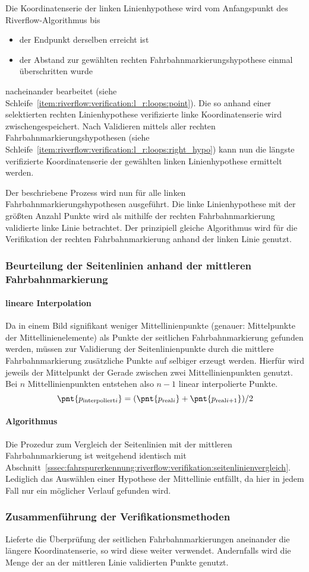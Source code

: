 Die Koordinatenserie der linken Linienhypothese wird vom Anfangspunkt des Riverflow-Algorithmus bis
\begin{itemize}
\item der Endpunkt derselben erreicht ist 
\item der Abstand zur gewählten rechten Fahrbahnmarkierungshypothese einmal überschritten wurde
\end{itemize}
nacheinander bearbeitet (siehe Schleife~\ref{item:riverflow:verification:l_r:loops:point}). Die so anhand einer selektierten rechten Linienhypothese verifizierte linke Koordinatenserie wird zwischengespeichert. 
Nach Validieren mittels aller rechten Fahrbahnmarkierungshypothesen (siehe Schleife~\ref{item:riverflow:verification:l_r:loops:right_hypo}) kann nun die längste verifizierte Koordinatenserie der gewählten linken Linienhypothese ermittelt werden.

Der beschriebene Prozess wird nun für alle linken Fahrbahnmarkierungshypothesen ausgeführt. Die linke Linienhypothese mit der größten Anzahl Punkte wird als mithilfe der rechten Fahrbahnmarkierung validierte linke Linie betrachtet. Der prinzipiell gleiche Algorithmus wird für die Verifikation der rechten Fahrbahnmarkierung anhand der linken Linie genutzt.

\subsubsection{Beurteilung der Seitenlinien anhand der mittleren Fahrbahnmarkierung}
\paragraph{lineare Interpolation}
Da in einem Bild signifikant weniger Mittellinienpunkte (genauer: Mittelpunkte der Mittellinienelemente) als Punkte der seitlichen Fahrbahnmarkierung gefunden werden, müssen zur Validierung der Seitenlinienpunkte durch die mittlere Fahrbahnmarkierung zusätzliche Punkte auf selbiger erzeugt werden. Hierfür wird jeweils der Mittelpunkt der Gerade zwischen zwei Mittellinienpunkten genutzt. Bei \( n \) Mittellinienpunkten entstehen also \( n-1 \) linear interpolierte Punkte.
\begin{equation}
\pnt{p_{\text{interpoliert}i}} = (\pnt{p_{\text{real}i}}+\pnt{p_{\text{real}i+1}})/2 
\end{equation}
\paragraph{Algorithmus} Die Prozedur zum Vergleich der Seitenlinien mit der mittleren Fahrbahnmarkierung ist weitgehend identisch mit Abschnitt~\ref{sssec:fahrspurerkennung:riverflow:verifikation:seitenlinienvergleich}. Lediglich das Auswählen einer Hypothese der Mittellinie entfällt, da hier in jedem Fall nur ein möglicher Verlauf gefunden wird.

\subsubsection{Zusammenführung der Verifikationsmethoden}
Lieferte die Überprüfung der seitlichen Fahrbahnmarkierungen aneinander die längere Koordinatenserie, so wird diese weiter verwendet. Andernfalls wird die Menge der an der mittleren Linie validierten Punkte genutzt.
